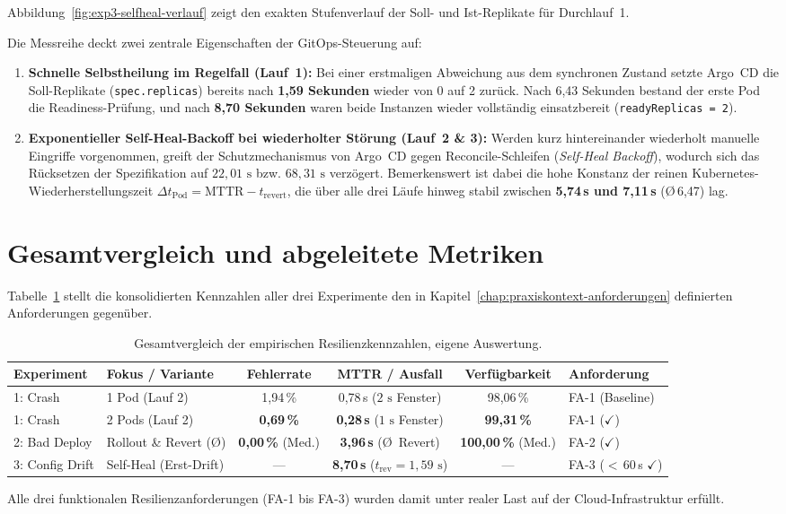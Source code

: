 Abbildung~\ref{fig:exp3-selfheal-verlauf} zeigt den exakten Stufenverlauf der Soll- und Ist-Replikate für Durchlauf~1.



Die Messreihe deckt zwei zentrale Eigenschaften der GitOps-Steuerung auf:
\begin{enumerate}[noitemsep,topsep=2pt]
    \item \textbf{Schnelle Selbstheilung im Regelfall (Lauf~1):} Bei einer erstmaligen Abweichung aus dem synchronen Zustand setzte Argo~CD die Soll-Replikate (\texttt{spec.replicas}) bereits nach \textbf{1,59 Sekunden} wieder von 0 auf 2 zurück. Nach 6{,}43 Sekunden bestand der erste Pod die Readiness-Prüfung, und nach \textbf{8,70 Sekunden} waren beide Instanzen wieder vollständig einsatzbereit (\texttt{readyReplicas = 2}).
    \item \textbf{Exponentieller Self-Heal-Backoff bei wiederholter Störung (Lauf~2 \& 3):} Werden kurz hintereinander wiederholt manuelle Eingriffe vorgenommen, greift der Schutzmechanismus von Argo~CD gegen Reconcile-Schleifen (\textit{Self-Heal Backoff}), wodurch sich das Rücksetzen der Spezifikation auf $22{,}01\text{ s}$ bzw. $68{,}31\text{ s}$ verzögert. Bemerkenswert ist dabei die hohe Konstanz der reinen Kubernetes-Wiederherstellungszeit $\Delta t_{\text{Pod}} = \text{MTTR} - t_{\text{revert}}$, die über alle drei Läufe hinweg stabil zwischen \textbf{5,74\,s und 7,11\,s} (\O\,6{,}47) lag.
\end{enumerate}

\section{Gesamtvergleich und abgeleitete Metriken}
\label{sec:zusammenfassung-messwerte}
Tabelle~\ref{tab:gesamtvergleich} stellt die konsolidierten Kennzahlen aller drei Experimente den in Kapitel~\ref{chap:praxiskontext-anforderungen} definierten Anforderungen gegenüber.

\begin{table}[H]
\centering
\small
\begin{tabular}{llcccl}
\toprule
\textbf{Experiment} & \textbf{Fokus / Variante} & \textbf{Fehlerrate} & \textbf{MTTR / Ausfall} & \textbf{Verfügbarkeit} & \textbf{Anforderung} \\
\midrule
1: Crash & 1 Pod (Lauf 2)  & 1,94\,\%          & 0,78\,s ($2\text{ s}$ Fenster) & 98,06\,\%          & FA-1 (Baseline) \\
1: Crash & 2 Pods (Lauf 2) & \textbf{0,69\,\%} & \textbf{0,28\,s} ($1\text{ s}$ Fenster) & \textbf{99,31\,\%} & FA-1 ($\checkmark$) \\
2: Bad Deploy & Rollout \& Revert (\O) & \textbf{0,00\,\%} (Med.) & \textbf{3,96\,s} (\O~Revert) & \textbf{100,00\,\%} (Med.) & FA-2 ($\checkmark$) \\
3: Config Drift & Self-Heal (Erst-Drift) & — & \textbf{8,70\,s} ($t_{\text{rev}}=1,59\text{ s}$) & — & FA-3 ($<$\,60\,s $\checkmark$) \\
\bottomrule
\end{tabular}
\caption{Gesamtvergleich der empirischen Resilienzkennzahlen, eigene Auswertung.}
\label{tab:gesamtvergleich}
\end{table}

Alle drei funktionalen Resilienzanforderungen (FA-1 bis FA-3) wurden damit unter realer Last auf der Cloud-Infrastruktur erfüllt.
